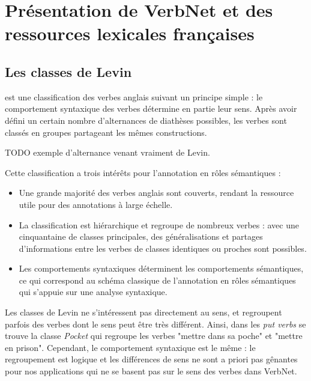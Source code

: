 \section{Présentation de VerbNet et des ressources lexicales françaises}
\label{french}

\subsection{Les classes de Levin}


\cite{levin1993english} est une classification des verbes anglais suivant un
principe simple : le comportement syntaxique des verbes détermine en partie
leur sens. Après avoir défini un certain nombre d'alternances de diathèses
possibles, les verbes sont classés en groupes partageant les mêmes
constructions.

TODO exemple d'alternance venant vraiment de Levin.

Cette classification a trois intérêts pour l'annotation en rôles sémantiques :

\begin{itemize}

    \item Une grande majorité des verbes anglais sont couverts, rendant la
        ressource utile pour des annotations à large échelle.

    \item La classification est hiérarchique et regroupe de nombreux verbes :
        avec une cinquantaine de classes principales, des généralisations et
        partages d'informations entre les verbes de classes identiques ou
        proches sont possibles.

    \item Les comportements syntaxiques déterminent les comportements
        sémantiques, ce qui correspond au schéma classique de l'annotation en
        rôles sémantiques qui s'appuie sur une analyse syntaxique.

\end{itemize}



Les classes de Levin ne s'intéressent pas directement au sens, et regroupent
parfois des verbes dont le sens peut être très différent.  Ainsi, dans les
\textit{put verbs} se trouve la classe \textit{Pocket} qui regroupe les verbes
"mettre dans sa poche" et "mettre en prison". Cependant, le comportement
syntaxique est le même : le regroupement est logique et les différences de sens
ne sont a priori pas gênantes pour nos applications qui ne se basent pas sur le
sens des verbes dans VerbNet.

